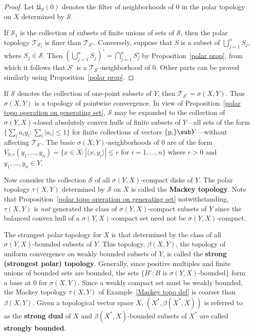 \begin{proof}
Let $\mathfrak{U}_\mathcal{S}(0)$ denotes the filter of neighborhoods of $0$ in the polar topology on $X$ determined by $\mathcal{S}$.\par
If $\mathcal{S}_1$ is the collection of subsets of finite unions of sets of $\mathcal{S}$, then the polar topology $\mathcal{T}_{\mathcal{S}_1^\circ}$ is finer than $\mathcal{T}_{\mathcal{S}^\circ}$. Conversely, suppose that $S$ is a subset of $\bigcup_{j=1}^{n}S_j$, where $S_j\in\mathcal{S}$. Then $(\bigcup_{j=1}^{n}S_j)^\circ=\bigcap_{j=1}^{n}S_j^\circ$ by Proposition~\ref{polar prop}, from which it follows that $S^\circ$ is a $\mathcal{T}_{\mathcal{S}^\circ}$-neighborhood of $0$. Other parts can be proved similarly using Proposition~\ref{polar prop}.
\end{proof}
\begin{example}
If $\mathcal{S}$ denotes the collection of one-point subsets of $Y$, then $\mathcal{T}_{\mathcal{S}^\circ}=\sigma(X,Y)$. Thus $\sigma(X,Y)$ is a topology of pointwise convergence. In view of Proposition~\ref{polar topo operation on generating set}, $\mathcal{S}$ may be expanded to the collection of $\sigma(Y,X)$-closed absolutely convex hulls of finite subsets of $Y$---all sets of the form $\{\sum_ia_iy_i:\sum_i|a_i|\leq 1\}$ for finite collections of vectors $\{y_i\}\sub Y$---without affecting $\mathcal{T}_{\mathcal{S}^\circ}$. The basic $\sigma(X,Y)$-neighborhoods of $0$ are of the form $V_{0,r}(y_1,\dots,y_n)=\{x\in X:|\langle x,y_i\rangle|\leq r\text{ for }i=1,\dots,n\}$ where $r>0$ and $y_1,\dots,y_n\in Y$.
\end{example}
\begin{example}\label{Mackey topo def}
Now consider the collection $\mathcal{S}$ of all $\sigma(Y,X)$-compact disks of $Y$. The polar topology $\tau(X,Y)$ determined by $\mathcal{S}$ on $X$ is called the \textbf{Mackey topology}. Note that Proposition~\ref{polar topo operation on generating set} notwithstanding, $\tau(X,Y)$ is \textit{not} generated  the class of $\sigma(Y,X)$-compact subsets of $Y$ since the balanced convex hull of a $\sigma(Y,X)$-compact set need not be $\sigma(Y,X)$-compact.
\end{example}
\begin{example}\label{strong topo def}
The strangest polar topology for $X$ is that determined by the class of all $\sigma(Y,X)$-bounded subsets of $Y$. This topology, $\beta(X,Y)$, the topology of uniform convergence on weakly bounded subsets of $Y$, is called the \textbf{strong (strongest polar) topology}. Generally, since positive multiples and finite unions of bounded sets are bounded, the sets $\{B^\circ:B\text{ is $\sigma(Y,X)$-bounded}\}$ form a base at $0$ for $\sigma(X,Y)$. Since a weakly compact set must be weakly bounded, the Mackey topology $\tau(X,Y)$ of Example~\ref{Mackey topo def} is coarser than $\beta(X,Y)$. Given a topological vector space $X$, $(X^*,\beta(X^*,X))$ is referred to as the \textbf{strong dual} of $X$ and $\beta(X^*,X)$-bounded subsets of $X^*$ are called \textbf{strongly bounded}.
\end{example}
